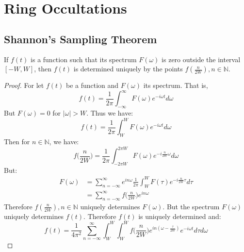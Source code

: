 \documentclass[crop=false,class=article,oneside]{standalone}
\begin{document}
    \ifx\ifresearchnotesosthemathematicsofcassini\undefined
        \section*{Ring Occultations}
        \setcounter{section}{1}
        \renewcommand\thesubfigure{%
            \arabic{section}.\arabic{figure}.\arabic{subfigure}%
        }
    \fi
    \subsection{Shannon's Sampling Theorem}
        \begin{theorem}
            If $f(t)$ is a function such that
            its spectrum $F(\omega)$ is zero
            outside the interval $[-W,W]$,
            then $f(t)$ is determined uniquely
            by the points $f(\frac{n}{2W}),n\in\mathbb{N}$.
        \end{theorem}
        \begin{proof}
            For let $f(t)$ be a function and
            $F(\omega)$ its spectrum. That is,
            \begin{equation*}
                f(t)=\frac{1}{2\pi}\int_{-\infty}^{\infty}
                     F(\omega)e^{-i\omega t}d\omega
            \end{equation*}
            But $F(\omega)=0$ for $|\omega|>W$. Thus we have:
            \begin{equation*}
                f(t)=\frac{1}{2\pi}\int_{W}^{W}
                     F(\omega)e^{-i\omega t}d\omega
            \end{equation*}
            Then for $n\in\mathbb{N}$, we have:
            \begin{equation*}
                f\big(\frac{n}{2W}\big)=\frac{1}{2\pi}
                \int_{-2\pi W}^{2\pi W}
                F(\omega)e^{-i\frac{n}{2W}\omega}d\omega
            \end{equation*}
            But:
            \begin{align*}
                F(\omega)
                &=\sum_{n=-\infty}^{\infty}e^{in\omega}
                  \frac{1}{2\pi}\int_{W}^{W}
                  F(\tau)e^{-i\frac{n}{2W}\tau}d\tau\\
                &=\sum_{n=-\infty}^{\infty}f
                  \big(\frac{n}{2W}\big)e^{in\omega}
            \end{align*}
            Therefore $f(\frac{n}{2W}), n\in \mathbb{N}$
            uniquely determines $F(\omega)$. But the
            spectrum $F(\omega)$ uniquely determines
            $f(t)$. Therefore $f(t)$ is
            uniquely determined and:
            \begin{equation*}
                f(t)=\frac{1}{4\pi^2}
                     \sum_{n=-\infty}^{\infty}
                     \int_{W}^{W}\int_{W}^{W}f
                     \big(
                         \frac{n}{2W}
                     \big)
                     e^{in(\omega-\frac{\tau}{2W})}
                     e^{-i\omega t}d\tau d\omega
            \end{equation*}
        \end{proof}
\end{document}
